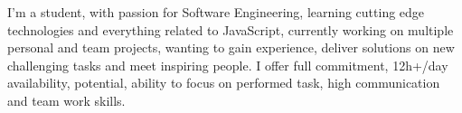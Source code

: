 

\begin{cvparagraph}


I'm a student, with passion for Software Engineering, learning cutting edge technologies and everything related to JavaScript, currently working on multiple personal and team projects, wanting to gain experience, deliver solutions on new challenging tasks and meet inspiring people. I offer full commitment, 12h+/day availability, potential, ability to focus on performed task, high communication and team work skills.
\end{cvparagraph}
